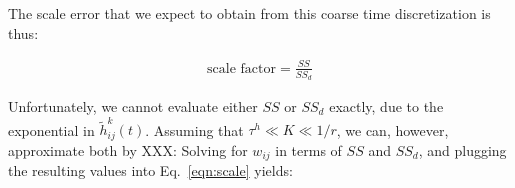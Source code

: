 The scale error that we expect to obtain from this coarse time discretization is thus: 

\begin{align} \label{eqn:scale}
	\text{scale factor} = \frac{SS}{SS_d}
\end{align}

Unfortunately, we cannot evaluate either $SS$ or $SS_d$ exactly, due to the exponential in $\tilde{h}_{ij}^k(t)$.  Assuming that $\tau^h \ll K \ll 1/r$, we can, however, approximate both by XXX:
Solving for $w_{ij}$ in terms of $SS$ and $SS_d$, and plugging the resulting values into Eq.~\ref{eqn:scale} yields:

